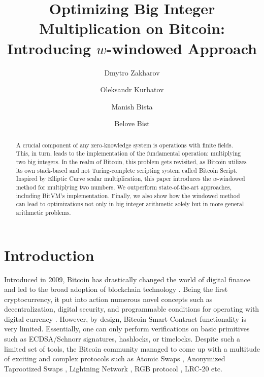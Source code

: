 \documentclass{iacrtrans}
\author{Dmytro Zakharov\inst{1} \and Oleksandr Kurbatov\inst{1} \and Manish Bista\inst{2} \and Belove Bist\inst{2}}
\institute{Distributed Lab \email{dmytro.zakharov@distributedlab.com}, \email{ok@distributedlab.com}\and Alpen Labs \email{manish@alpenlabs.io }, \email{belove@alpenlabs.io}}
\title[Optimizing Big Integer Multiplication on Bitcoin]{Optimizing Big Integer Multiplication on Bitcoin: Introducing $w$-windowed Approach}
\begin{document}
\maketitle


\begin{abstract}
    A crucial component of any zero-knowledge system is operations with
    finite fields. This, in turn, leads to the implementation of the fundamental operation: multiplying two big integers. In the realm of Bitcoin, this problem gets revisited, as Bitcoin utilizes its own stack-based and not Turing-complete scripting system
    called Bitcoin Script. Inspired by Elliptic Curve scalar multiplication, this paper
    introduces the $w$-windowed method for multiplying two numbers. We outperform state-of-the-art approaches, including BitVM’s implementation. Finally, we also show how the windowed method can lead to optimizations not only in big integer arithmetic solely but in more general arithmetic problems.
\end{abstract}

\tableofcontents{}

\section{Introduction}

Introduced in 2009, Bitcoin has drastically changed the world of digital finance and led to the broad adoption of blockchain technology \cite{bitcoin_paper}. Being the first cryptocurrency, it put into action numerous novel concepts such as decentralization, digital security, and programmable conditions for operating with digital currency \cite{bitcoin_analysis_1,bitcoin_analysis_2}. However, by design, Bitcoin Smart Contract functionality is very limited. Essentially, one can only perform verifications on basic primitives such as ECDSA/Schnorr signatures, hashlocks, or timelocks. Despite such a limited set of tools, the Bitcoin community managed to come up with a multitude of exciting and complex protocols such as Atomic Swaps \cite{atomic_swap_1,atomic_swap_2}, Anonymized Taprootized Swaps \cite{atomic_swap_3}, Lightning Network \cite{lightning_1,lightning_2}, RGB protocol \cite{rgb}, LRC-20 \cite{yuv} etc.
\end{document}
